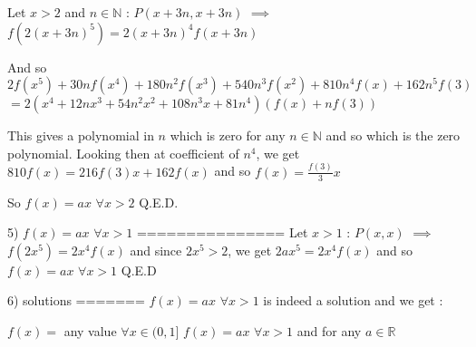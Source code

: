 \begin{solution}
Let $x>2$ and $n\in\mathbb N$ : $P(x+3n,x+3n)$ $\implies$ $f(2(x+3n)^5)=2(x+3n)^4f(x+3n)$

And so $2f(x^5)+30nf(x^4)+180n^2f(x^3)+540n^3f(x^2)+810n^4f(x)+162n^5f(3)$ $=2(x^4+12nx^3+54n^2x^2+108n^3x+81n^4)(f(x)+nf(3))$

This gives a polynomial in $n$ which is zero for any $n\in\mathbb N$ and so which is the zero polynomial.
Looking then at coefficient of $n^4$, we get $810f(x)=216f(3)x+162f(x)$ and so $f(x)=\frac{f(3)}3x$

So $f(x)=ax$ $\forall x>2$
Q.E.D.

5) $f(x)=ax$ $\forall x>1$
===============
Let $x>1$ : $P(x,x)$ $\implies$ $f(2x^5)=2x^4f(x)$ and since $2x^5>2$, we get $2ax^5=2x^4f(x)$ and so $f(x)=ax$ $\forall x>1$
Q.E.D

6) solutions
=======
$f(x)=ax$ $\forall x>1$ is indeed a solution and we get :

$f(x)=$ any value $\forall x\in(0,1]$
$f(x)=ax$ $\forall x>1$ and for any $a\in\mathbb R$
\end{solution}



